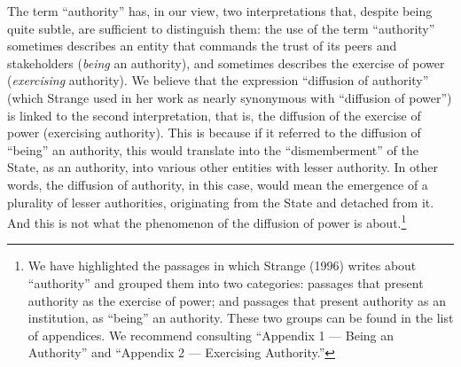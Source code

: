 The term ``authority'' has, in our view, two interpretations that, despite being quite subtle, are sufficient to distinguish them: the use of the term ``authority'' sometimes describes an entity that commands the trust of its peers and stakeholders (\textit{being} an authority), and sometimes describes the exercise of power (\textit{exercising} authority). We believe that the expression ``diffusion of authority'' (which Strange used in her work as nearly synonymous with ``diffusion of power'') is linked to the second interpretation, that is, the diffusion of the exercise of power (exercising authority). This is because if it referred to the diffusion of ``being'' an authority, this would translate into the ``dismemberment'' of the State, as an authority, into various other entities with lesser authority. In other words, the diffusion of authority, in this case, would mean the emergence of a plurality of lesser authorities, originating from the State and detached from it. And this is not what the phenomenon of the diffusion of power is about.\footnote{We have highlighted the passages in which Strange (1996) writes about ``authority'' and grouped them into two categories: passages that present authority as the exercise of power; and passages that present authority as an institution, as ``being'' an authority. These two groups can be found in the list of appendices. We recommend consulting ``Appendix 1 --- Being an Authority'' and ``Appendix 2 --- Exercising Authority.''}

